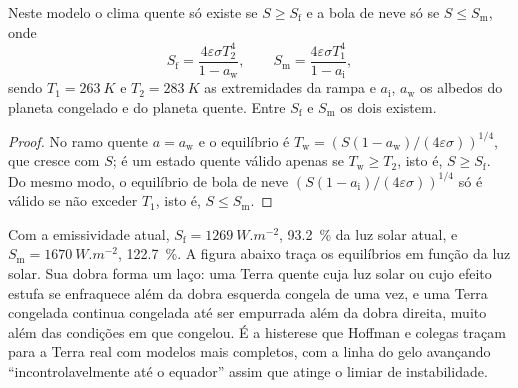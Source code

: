 \begin{proposition}\label{prop:b2:precambrian-earth:tipping}
Neste modelo o clima quente só existe se $S \ge S_{\text{f}}$ e a bola de neve só se
$S \le S_{\text{m}}$, onde
\[
  S_{\text{f}} = \frac{4\varepsilon\sigma T_2^4}{1 - a_{\text{w}}}, \qquad
  S_{\text{m}} = \frac{4\varepsilon\sigma T_1^4}{1 - a_{\text{i}}},
\]
sendo $T_1 = \qty{263}{K}$ e $T_2 = \qty{283}{K}$ as extremidades da rampa e $a_{\text{i}}$,
$a_{\text{w}}$ os albedos do planeta congelado e do planeta quente. Entre $S_{\text{f}}$ e
$S_{\text{m}}$ os dois existem.
\end{proposition}

\begin{proof}
No ramo quente $a = a_{\text{w}}$ e o equilíbrio é $T_{\text{w}} = (S(1 -
a_{\text{w}})/(4\varepsilon\sigma))^{1/4}$, que cresce com $S$; é um estado quente válido apenas
se $T_{\text{w}} \ge T_2$, isto é, $S \ge S_{\text{f}}$. Do mesmo modo, o equilíbrio de bola de neve
$(S(1 - a_{\text{i}})/(4\varepsilon\sigma))^{1/4}$ só é válido se não exceder $T_1$, isto
é, $S \le S_{\text{m}}$.
\end{proof}

Com a emissividade atual, $S_{\text{f}} = \qty{1269}{W.m^{-2}}$, \qty{93.2}{\percent} da luz solar
atual, e $S_{\text{m}} = \qty{1670}{W.m^{-2}}$, \qty{122.7}{\percent}. A figura abaixo
traça os equilíbrios em função da luz solar. Sua dobra forma um laço: uma Terra quente cuja luz solar
ou cujo efeito estufa se enfraquece além da dobra esquerda congela de uma vez, e uma Terra congelada continua congelada
até ser empurrada além da dobra direita, muito além das condições em que congelou. É
a histerese que Hoffman e colegas traçam para a Terra real com modelos mais completos,
com a linha do gelo avançando ``incontrolavelmente até o equador'' assim que atinge o limiar
de instabilidade.

